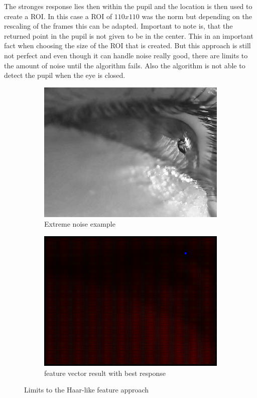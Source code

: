 The stronges response lies then within the pupil and the location is then used to create a ROI. In this case a ROI of $110 x 110$ was the norm but depending on the rescaling of the frames this can be adapted. Important to note is, that the returned point in the pupil is not given to be in the center. This in an important fact when choosing the size of the ROI that is created. 
But this approach is still not perfect and even though it can handle noise really good, there are limits to the amount of noise until the algorithm fails. Also the algorithm is not able to detect the pupil when the eye is closed.

\begin{figure}[h]
    \centering
    \begin{subfigure}{0.5\textwidth}
        \centering
        \includegraphics[width=0.9\linewidth]{plots/results/originalworst.png}
        \caption{Extreme noise example}
    \end{subfigure}%
    \hfill
    \begin{subfigure}{0.5\textwidth}
        \centering
        \includegraphics[width=0.9\linewidth]{plots/results/responsehaarworst.png}
        \caption{feature vector result with best response}
    \end{subfigure}%
 
    \caption{Limits to the Haar-like feature approach}
    \label{fig:limit_haar}
\end{figure}
